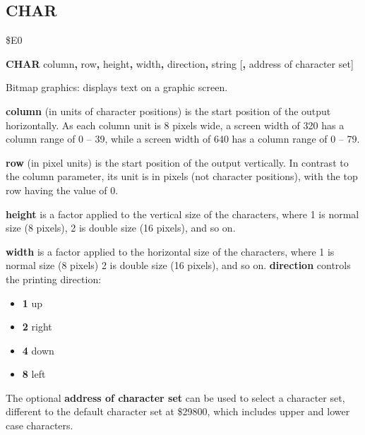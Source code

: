 
\newpage
\subsection{CHAR}
\begin{description}[leftmargin=2cm,style=nextline]
\item [Token:] \$E0
\item [Format:] {\bf CHAR} column{\bf,} row{\bf,} height{\bf,} width{\bf,}
		direction{\bf,} string [{\bf,} address of character set]
\item [Usage:]  Bitmap graphics: displays text on a graphic screen.

                {\bf column} (in units of character positions) is the
                start position of the output horizontally.
                As each column unit is 8 pixels wide, a screen width of 320
                has a column range of 0 -- 39, while a screen width of 640
                has a column range of 0 -- 79.

                {\bf row} (in pixel units) is the start position of the output
                vertically. In contrast to the column parameter,
                its unit is in pixels (not character positions), with the top
                row having the value of 0.

                {\bf height} is a factor applied to the vertical
                size of the characters, where 1 is normal size (8 pixels),
                2 is double size (16 pixels), and so on.

                {\bf width} is a factor applied to the horizontal
                size of the characters, where 1 is normal size (8 pixels)
                2 is double size (16 pixels), and so on.
                {\bf direction} controls the printing direction: \\
                \begin{itemize}
                    \item {\bf 1} up
                    \item {\bf 2} right
                    \item {\bf 4} down
                    \item {\bf 8} left
                \end{itemize}

                The optional {\bf address of character set} can be used
                to select a character set, different to the default
                character set at \$29800, which includes upper and lower case
                characters.


\end{description}
